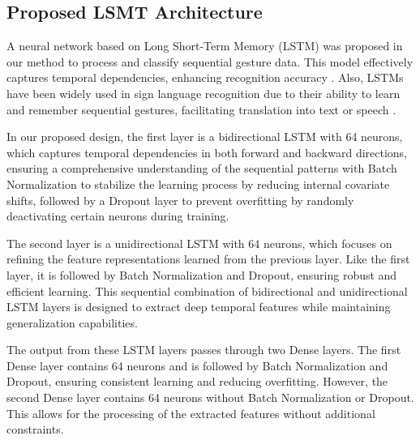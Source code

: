 \documentclass[preprint,12pt,authoryear]{elsarticle}
\begin{document}



\subsection{Proposed LSMT Architecture}


A neural network based on Long Short-Term Memory (LSTM) was proposed in our method to process and classify sequential gesture data. This model effectively captures temporal dependencies, enhancing recognition accuracy \cite{Kumari24, Mali23}. Also, LSTMs have been widely used in sign language recognition due to their ability to learn and remember sequential gestures, facilitating translation into text or speech \cite{Kumari24, Mali23}.

In our proposed design, the first layer is a bidirectional LSTM with 64 neurons, which captures temporal dependencies in both forward and backward directions, ensuring a comprehensive understanding of the sequential patterns with Batch Normalization to stabilize the learning process by reducing internal covariate shifts, followed by a Dropout layer to prevent overfitting by randomly deactivating certain neurons during training.

The second layer is a unidirectional LSTM with 64 neurons, which focuses on refining the feature representations learned from the previous layer. Like the first layer, it is followed by Batch Normalization and Dropout, ensuring robust and efficient learning. This sequential combination of bidirectional and unidirectional LSTM layers is designed to extract deep temporal features while maintaining generalization capabilities.

The output from these LSTM layers passes through two Dense layers. The first Dense layer contains 64 neurons and is followed by Batch Normalization and Dropout, ensuring consistent learning and reducing overfitting. However, the second Dense layer contains 64 neurons without Batch Normalization or Dropout. This allows for the processing of the extracted features without additional constraints.
\end{document}
